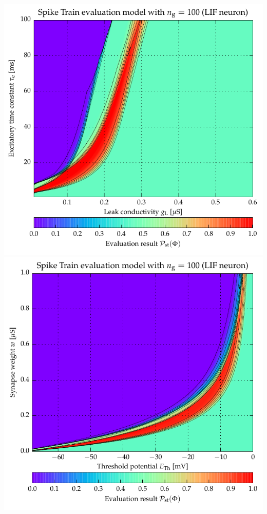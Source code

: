 {\newpage
\vspace*{1.5cm}
\includegraphics[trim=0cm 1.75cm 0cm 0cm,clip]{media/appC/i3_ex_sc1_Train_N100_XgL_YtauE_pBin_Train_IfCondExp.pdf}\\
\vspace{0.5cm}
\includegraphics[trim=0cm 0cm 0cm 0.1cm,clip]{media/appC/i13_ex_sc1_Train_N100_XeTh_Yw_pBin_Train_IfCondExp.pdf}

}
